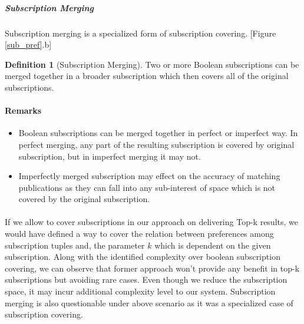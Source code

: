 \documentclass[a4paper,12pt,oneside]{book}
\theoremstyle{definition}
\newtheorem{definition}{Definition}[section]
\theoremstyle{remark}
\begin{document}
\subparagraph*{Subscription Merging}
\paragraph*{}
Subscription merging is a specialized form of subscription covering. [Figure \ref{sub_pref}.b]
\begin{definition}[Subscription Merging]
Two or more Boolean subscriptions can be merged together in a broader subscription which then covers all of the original subscriptions.
\end{definition}

\paragraph*{Remarks}
\begin{itemize}
\item Boolean subscriptions can be merged together in perfect or imperfect way. In perfect merging, any part of the resulting subscription is covered by original subscription, but in imperfect merging it may not.
\item Imperfectly merged subscription may effect on the accuracy of matching publications as they can fall into any sub-interest of space which is not covered by the original subscription.
\end{itemize}

\paragraph*{}
If we allow to cover subscriptions in our approach on delivering Top-k results, we would have defined a way to cover the relation between preferences among subscription tuples and, the parameter $k$ which is dependent on the given subscription. Along with the identified complexity over boolean subscription covering, we can observe that former approach won't provide any benefit in top-k subscriptions but avoiding rare cases. Even though we reduce the subscription space, it may incur additional complexity level to our system. Subscription merging is also questionable under above scenario as it was a specialized case of subscription covering.
%
\end{document}
